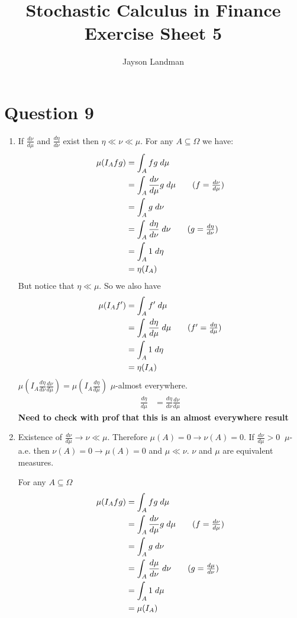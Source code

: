 \documentclass[12pt, letterpaper]{article}
\title{Stochastic Calculus in Finance\\
		\large Exercise Sheet 5}
\author{Jayson Landman}
\begin{document}
	\section*{Question 9}
	 
	 \begin{enumerate} [label = \textbf{\alph*)}]
		\item If $\frac{d\nu}{d\mu}$ and $\frac{d\eta}{d\nu}$ exist then $\eta \ll \nu \ll \mu$. For any $A \subseteq \Omega$ we have:
		\begin{align*}
			\mu(I_A fg) & = \int_A fg \; d\mu \\
			& = \int_A \frac{d\nu}{d\mu} g \; d\mu \tag{$f = \frac{d\nu}{d\mu}$}\\
			& = \int_A g \; d\nu \\
			& = \int_A \frac{d\eta}{d\nu} \; d\nu \tag{$g = \frac{d\eta}{d\nu}$} \\
			& = \int_A 1 \; d\eta \\
			& = \eta(I_A)
		\end{align*}
		But notice that $\eta \ll \mu$. So we also have 
		\begin{align*}
			\mu(I_A f') & = \int_A f' \; d\mu \\
			& = \int_A \frac{d\eta}{d\mu}  \; d\mu \tag{$f' = \frac{d\eta}{d\mu}$}\\
			& = \int_A 1 \; d\eta \\
			& = \eta(I_A)
		\end{align*}
		$\mu(I_A\frac{d\eta}{d\nu}\frac{d\nu}{d\mu}) = \mu(I_A\frac{d\eta}{d\mu})$	$\mu$-almost everywhere. 
		\begin{align*}
			\frac{d\eta}{d\mu} & = \frac{d\eta}{d\nu}\frac{d\nu}{d\mu} \tag{$\mu$-almost everywhere}  
		\end{align*}
		\textbf{Need to check with prof that this is an almost everywhere result}
		\newpage
		\item Existence of $\frac{d\nu}{d\mu} \rightarrow \nu \ll \mu$. Therefore $\mu(A) = 0 \rightarrow \nu(A) = 0.$ \newline
		If $\frac{d\nu}{d\mu} > 0 \; \; \mu$-a.e. then $\nu(A) = 0 \rightarrow \mu(A) = 0$ and $\mu \ll \nu$. \newline $\nu$ and $\mu$ are equivalent measures.
		
		For any $A \subseteq \Omega$
		\begin{align*}
			\mu(I_A fg) & = \int_A fg \; d\mu \\
			& = \int_A \frac{d\nu}{d\mu} g \; d\mu \tag{$f = \frac{d\nu}{d\mu}$}\\
			& = \int_A g \; d\nu \\
			& = \int_A \frac{d\mu}{d\nu} \; d\nu \tag{$g = \frac{d\mu}{d\nu}$} \\
			& = \int_A 1 \; d\mu \\
			& = \mu(I_A)
		\end{align*}
		

\end{enumerate}
\end{document}
